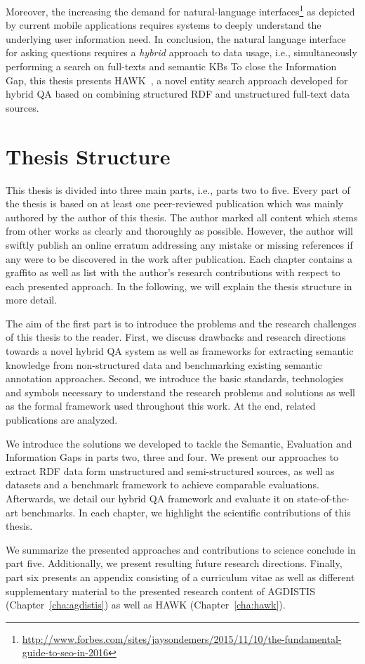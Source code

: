 \begin{enumerate}
Moreover, the increasing the demand for natural-language interfaces\footnote{\url{http://www.forbes.com/sites/jaysondemers/2015/11/10/the-fundamental-guide-to-seo-in-2016}} as depicted by current mobile applications requires systems to deeply understand the underlying user information need.
In conclusion, the natural language interface for asking questions requires a  \emph{hybrid} approach to data usage, i.e., simultaneously performing a search on full-texts and semantic \ac{KB}s 
To close the {Information Gap}, this thesis presents HAWK~\cite{hawk_2015}, a novel entity search approach developed for hybrid \ac{QA} based on combining structured \ac{RDF} and unstructured full-text data sources.
\end{enumerate}



\section*{Thesis Structure}

This thesis is divided into three main parts, i.e., parts two to five.
Every part of the thesis is based on at least one peer-reviewed publication which was mainly authored by the author of this thesis.
The author marked all content which stems from other works as clearly and thoroughly as possible. 
However, the author will swiftly publish an online erratum addressing any mistake or missing references if any were to be discovered in the work after publication.
Each chapter contains a graffito as well as list with the author's research contributions with respect to each presented approach.
In the following, we will explain the thesis structure in more detail.

The aim of the first part is to introduce the problems and the research challenges of this thesis to the reader. 
First, we discuss drawbacks and research directions towards a novel hybrid \ac{QA} system as well as frameworks for extracting semantic knowledge from non-structured data and benchmarking existing semantic annotation approaches.
Second, we introduce the basic standards, technologies and symbols necessary to understand the research problems and solutions as well as the formal framework used throughout this work.
At the end, related publications are analyzed.

We introduce the solutions we developed to tackle the Semantic, Evaluation and Information Gaps in parts two, three and four.  
We  present our approaches to extract \ac{RDF} data form unstructured and semi-structured sources, as well as datasets and a benchmark framework to achieve comparable evaluations. 
Afterwards, we detail our hybrid \ac{QA} framework and evaluate it on state-of-the-art benchmarks.
In each chapter, we highlight the scientific contributions of this thesis.

We  summarize the presented approaches and contributions to science conclude in part five. 
Additionally, we present resulting future research directions.
Finally, part six presents an appendix consisting of a curriculum vitae as well as different supplementary material to the presented research content of AGDISTIS (Chapter~\ref{cha:agdistis}) as well as HAWK (Chapter~\ref{cha:hawk}).